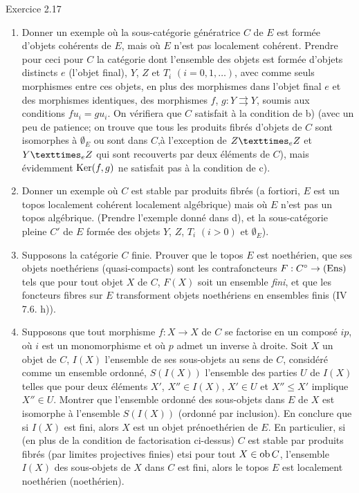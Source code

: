\documentclass[10pt]{../fichiers-configuration-latex/smfart}
\begin{document}
\begin{enonce*}[remark]{Exercice 2.17}
\begin{enumerate}
\item Donner un exemple où la sous-catégorie génératrice $C$ de $E$
  est formée d'objets cohérents de $E$, mais où $E$ n'est pas
  localement cohérent. Prendre pour ceci pour $C$ la catégorie dont
  l'ensemble des objets est formée d'objets distincts $e$ (l'objet
  final), $Y$, $Z$ et $T_i$ $(i=0, 1, \ldots)$, avec comme seuls
  morphismes entre ces objets, en plus des morphismes dans l'objet
  final $e$ et des morphismes identiques, des morphismes $f$, $g : Y
  \rightrightarrows Y$, soumis aux conditions $fu_i = gu_i$. On
  vérifiera que $C$ satisfait à la condition de b) (avec un peu de
  patience; on trouve que tous les produits fibrés d'objets de $C$
  sont isomorphes à $∅_E$ ou sont dans $C$,\pageoriginale à
  l'exception de $\fprod{Z}{Z}{e}$ et $\fprod{Y}{Z}{e}$ qui sont recouverts par deux
  éléments de $C$), mais évidemment $\operatorname{Ker}(f, g)$ ne satisfait pas à la
  condition de c).

\item Donner un exemple où $C$ est stable par produits fibrés (a
  fortiori, $E$ est un topos localement cohérent \ie localement
  algébrique) mais où $E$ n'est pas un topos algébrique. (Prendre
  l'exemple donné dans d), et la sous-catégorie pleine $C'$ de $E$
  formée des objets $Y$, $Z$, $T_{i}$ $(i > 0)$ et $∅_{E}$).

\item Supposons la catégorie $C$ finie. Prouver que le topos $E$ est
  noethérien, que ses objets noethériens (\ie quasi-compacts) sont les
  contrafoncteurs $F : C^{\circ} \to (\Ens)$ tels que pour tout objet
  $X$ de $C$, $F(X)$ soit un ensemble \emph{fini}, et que les
  foncteurs fibres sur $E$ transforment objets noethériens en
  ensembles finis (\cf IV 7.6. h)).

\item Supposons que tout morphisme $f: X \to X$ de $C$ se factorise en
  un composé $ip$, où $i$ est un monomorphisme et où $p$ admet un
  inverse à droite. Soit $X$ un objet de $C$, $I(X)$ l'ensemble de ses
  sous-objets au sens de $C$, considéré comme un ensemble ordonné,
  $S(I(X))$ l'ensemble des parties $U$ de $I(X)$ telles que pour deux
  éléments $X'$, $X'' \in I(X)$, $X'\in U$ et $X''\leq X'$ implique
  $X''\in U$. Montrer que l'ensemble ordonné des sous-objets dans $E$
  de $X$ est isomorphe à l'ensemble $S(I(X))$ (ordonné par
  inclusion). En conclure que si $I(X)$ est fini, alors $X$ est un
  objet prénoethérien de $E$. En particulier, si (en plus de la
  condition de factorisation ci-dessus) $C$ est stable par produits
  fibrés (\resp par limites projectives finies) et\pageoriginale si
  pour tout $X \in
  \operatorname{ob} C$, l'ensemble $I(X)$ des sous-objets de $X$ dans $C$ est fini,
  alors le topos $E$ est localement noethérien (\resp noethérien).


\end{enumerate}
\end{enonce*}
\end{document}
